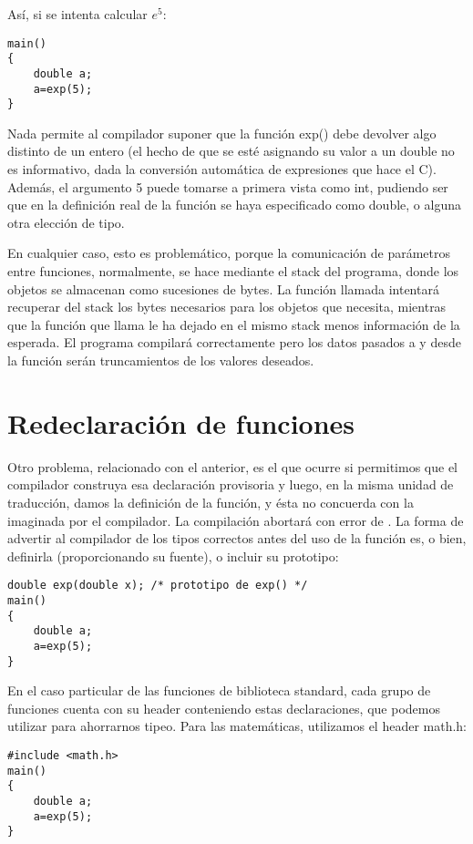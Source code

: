 Así, si se intenta calcular $e^5$:
\begin{lstlisting}
main()
{
    double a;
    a=exp(5);
}
\end{lstlisting}

Nada permite al compilador suponer que la función exp() debe devolver algo
distinto de un entero (el hecho de que se esté asignando su valor a un double
no es informativo, dada la conversión automática de expresiones que hace el C).
Además, el argumento 5 puede tomarse a primera vista como int, pudiendo ser que
en la definición real de la función se haya especificado como double, o alguna
otra elección de tipo.

En cualquier caso, esto es problemático, porque la comunicación de parámetros
entre funciones, normalmente, se hace mediante el stack del programa, donde los
objetos se almacenan como sucesiones de bytes. La función llamada intentará
recuperar del stack los bytes necesarios para  los objetos que necesita,
mientras que la función que llama le ha dejado en el mismo stack menos
información de la esperada. El programa compilará correctamente pero los datos
pasados a y desde la función serán truncamientos de los valores deseados.

\section{Redeclaración de funciones}
Otro problema, relacionado con el anterior, es el que ocurre si permitimos que
el compilador construya esa declaración provisoria y luego, en la misma unidad
de traducción, damos la definición de la función, y ésta no concuerda con la
imaginada por el compilador. La compilación abortará con error de
.
La forma de advertir al compilador de los tipos correctos antes del uso de la
función es, o bien, definirla (proporcionando su fuente), o incluir su
prototipo:
\begin{lstlisting}
double exp(double x); /* prototipo de exp() */
main()
{
    double a;
    a=exp(5);
}
\end{lstlisting}

En el caso particular de las funciones de biblioteca standard, cada grupo de
funciones cuenta con su header conteniendo estas declaraciones, que podemos
utilizar para ahorrarnos tipeo. Para las matemáticas, utilizamos el header
math.h:
\begin{lstlisting}
#include <math.h>
main()
{
    double a;
    a=exp(5);
}
\end{lstlisting}

